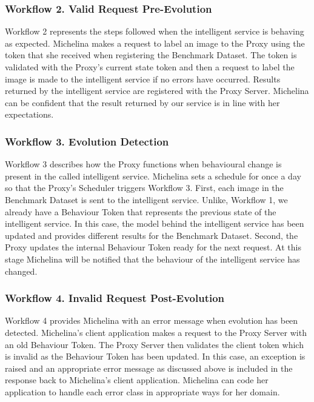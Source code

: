 \subsubsection{Workflow 2. Valid Request Pre-Evolution}

Workflow 2 represents the steps followed when the intelligent service is behaving as expected. Michelina makes a request to label an image to the Proxy using the token that she received when registering the Benchmark Dataset. The token is validated with the Proxy's current state token and then a request to label the image is made to the intelligent service if no errors have occurred. Results returned by the intelligent service are registered with the Proxy Server. Michelina can be confident that the result returned by our service is in line with her expectations.

\subsubsection{Workflow 3. Evolution Detection}

Workflow 3 describes how the Proxy functions when behavioural change is present in the called intelligent service. Michelina sets a schedule for once a day so that the Proxy's Scheduler triggers Workflow 3. First, each image in the Benchmark Dataset is sent to the intelligent service. Unlike, Workflow 1, we already have a Behaviour Token that represents the previous state of the intelligent service. In this case, the model behind the intelligent service has been updated and provides different results for the Benchmark Dataset. Second, the Proxy updates the internal Behaviour Token ready for the next request. At this stage Michelina will be notified that the behaviour of the intelligent service has changed. 

\subsubsection{Workflow 4. Invalid Request Post-Evolution}

Workflow 4 provides Michelina with an error message when evolution has been detected. Michelina's client application makes a request to the Proxy Server with an old Behaviour Token. The Proxy Server then validates the client token which is invalid as the Behaviour Token has been updated. In this case, an exception is raised and an appropriate error message as discussed above is included in the response back to Michelina's client application. Michelina can code her application to handle each error class in appropriate ways for her domain.


